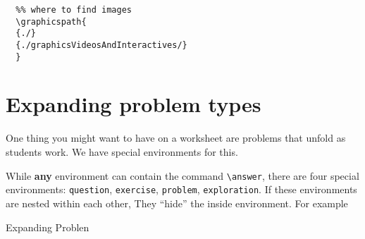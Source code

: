 \documentclass{ximera}
\begin{document}
\begin{verbatim}
  %% where to find images
  \graphicspath{
  {./}
  {./graphicsVideosAndInteractives/}
  }
  \end{verbatim}

\section{Expanding problem types}

One thing you might want to have on a worksheet are problems that unfold as
students work. We have special environments for this.

While \textbf{any} environment can contain the command \verb|\answer|,
there are four special environments: \verb|question|, \verb|exercise|,
\verb|problem|, \verb|exploration|. If these environments are nested within
each other, They ``hide'' the inside environment. For example

\begin{problem}
Expanding Problen
\end{problem}
\end{document}

